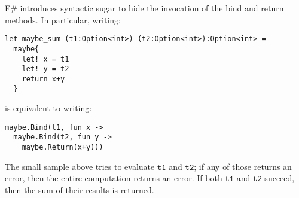 F\# introduces syntactic sugar to hide the invocation of the bind and
return methods. In particular, writing: 

\medskip
\begin{lstlisting}
let maybe_sum (t1:Option<int>) (t2:Option<int>):Option<int> =
  maybe{
    let! x = t1
    let! y = t2
    return x+y
  }
\end{lstlisting}

is equivalent to writing:
\begin{lstlisting}
maybe.Bind(t1, fun x ->
  maybe.Bind(t2, fun y ->
    maybe.Return(x+y)))
\end{lstlisting}

The small sample above tries to evaluate $\mathtt{t1}$ and
$\mathtt{t2}$; if any of those returns an error, then the entire
computation returns an error. If both $\mathtt{t1}$ and
$\mathtt{t2}$ succeed, then the sum of their results is returned.